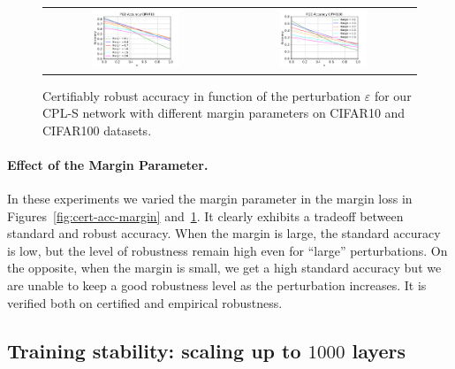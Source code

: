 \begin{figure}[h]
    \centering
    \begin{tabular}{cc}
    \includegraphics[width=0.49\textwidth]{sections/4_certification/images/pgd_acc_margin_eps_c10.pdf}&\includegraphics[width=0.49\textwidth]{sections/4_certification/images/pgd_acc_margin_eps_c100.pdf}
    \end{tabular}
    \caption{Certifiably robust accuracy in function of the perturbation $\varepsilon$ for our CPL-S  network with different margin parameters on CIFAR10 and CIFAR100 datasets.}
    \label{fig:pgd-acc-margin}
\end{figure}

\paragraph{Effect of the Margin Parameter.}
In these experiments we varied the margin parameter in the margin loss in Figures~\ref{fig:cert-acc-margin} and~\ref{fig:pgd-acc-margin}. It clearly exhibits a tradeoff between standard and robust accuracy. When the margin is large, the standard accuracy is low, but the level of robustness remain high even for ``large'' perturbations. On the opposite, when the margin is small, we get a high standard accuracy but we are unable to keep a good robustness level as the perturbation increases. It is verified both on certified and empirical robustness.





\subsection{Training stability: scaling up to $1000$ layers}

